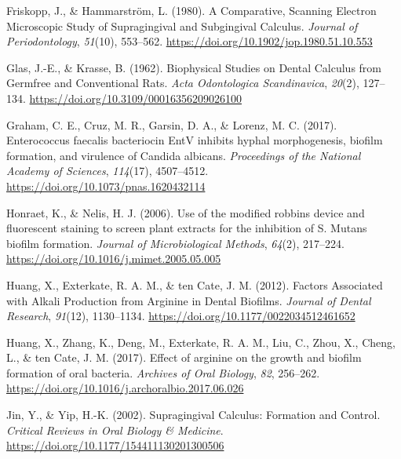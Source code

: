 \documentclass[
  letterpaper,
]{book}
\newlength{\cslhangindent}
\newlength{\cslentryspacingunit} %
\newenvironment{CSLReferences}[2] %
 {%
  \setlength{\parindent}{0pt}
  \ifodd #1
  \let\oldpar\par
  \def\par{\hangindent=\cslhangindent\oldpar}
  \fi
  \setlength{\parskip}{#2\cslentryspacingunit}
 }%
 {}
\begin{document}
\begin{CSLReferences}{1}{0}
\leavevmode{}%
Friskopp, J., \& Hammarström, L. (1980). A {Comparative}, {Scanning
Electron Microscopic Study} of {Supragingival} and {Subgingival
Calculus}. \emph{Journal of Periodontology}, \emph{51}(10), 553--562.
\url{https://doi.org/10.1902/jop.1980.51.10.553}

\leavevmode{}%
Glas, J.-E., \& Krasse, B. (1962). Biophysical {Studies} on {Dental
Calculus} from {Germfree} and {Conventional Rats}. \emph{Acta
Odontologica Scandinavica}, \emph{20}(2), 127--134.
\url{https://doi.org/10.3109/00016356209026100}

\leavevmode{}%
Graham, C. E., Cruz, M. R., Garsin, D. A., \& Lorenz, M. C. (2017).
Enterococcus faecalis bacteriocin {EntV} inhibits hyphal morphogenesis,
biofilm formation, and virulence of {Candida} albicans.
\emph{Proceedings of the National Academy of Sciences}, \emph{114}(17),
4507--4512. \url{https://doi.org/10.1073/pnas.1620432114}

\leavevmode{}%
Honraet, K., \& Nelis, H. J. (2006). Use of the modified robbins device
and fluorescent staining to screen plant extracts for the inhibition of
{S}. Mutans biofilm formation. \emph{Journal of Microbiological
Methods}, \emph{64}(2), 217--224.
\url{https://doi.org/10.1016/j.mimet.2005.05.005}

\leavevmode{}%
Huang, X., Exterkate, R. A. M., \& ten Cate, J. M. (2012). Factors
{Associated} with {Alkali Production} from {Arginine} in {Dental
Biofilms}. \emph{Journal of Dental Research}, \emph{91}(12), 1130--1134.
\url{https://doi.org/10.1177/0022034512461652}

\leavevmode{}%
Huang, X., Zhang, K., Deng, M., Exterkate, R. A. M., Liu, C., Zhou, X.,
Cheng, L., \& ten Cate, J. M. (2017). Effect of arginine on the growth
and biofilm formation of oral bacteria. \emph{Archives of Oral Biology},
\emph{82}, 256--262.
\url{https://doi.org/10.1016/j.archoralbio.2017.06.026}

\leavevmode{}%
Jin, Y., \& Yip, H.-K. (2002). Supragingival {Calculus}: {Formation} and
{Control}. \emph{Critical Reviews in Oral Biology \& Medicine}.
\url{https://doi.org/10.1177/154411130201300506}


\end{CSLReferences}
\end{document}
